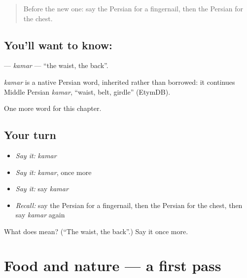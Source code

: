 \label{lesson:FA-C108-kamar}



\begin{quote}
Before the new one: say the Persian for a fingernail, then the Persian for the chest.
\end{quote}

\subsection*{You'll want to know: }
\textbf{} — \emph{kamar} — \textquotedblleft{}the waist, the back\textquotedblright{}.

\begin{cousinweb}
\emph{kamar} is a native Persian word, inherited rather than borrowed: it continues Middle Persian \emph{kamar}, \textquotedblleft{}waist, belt, girdle\textquotedblright{} (EtymDB).
\end{cousinweb}

\begin{grammarlens}[title={What you've built}]
One more word for this chapter.
\end{grammarlens}

\subsection*{Your turn}
\begin{itemize}
\raggedright
  \item \emph{Say it:} \emph{kamar}
  \item \emph{Say it:} \emph{kamar}, once more
  \item \emph{Say it:} say \emph{kamar}
  \item \emph{Recall:} say the Persian for a fingernail, then the Persian for the chest, then say \emph{kamar} again
\end{itemize}

\begin{tcolorbox}[breakable,colback=teal!4,colframe=teal!35!black,title={Before you move on}]
What does  mean? (\textquotedblleft{}The waist, the back\textquotedblright{}.) Say it once more.
\end{tcolorbox}
\section[(dialogue)]{Food and nature — a first pass}

\label{lesson:FA-R108-first-pass-food-and-nature}



